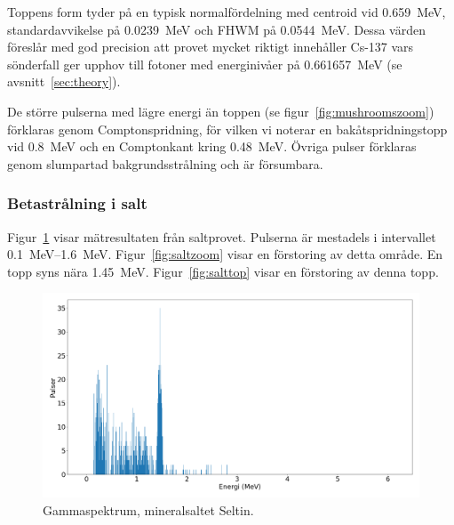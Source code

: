 Toppens form tyder på en typisk normalfördelning med centroid vid
\qty{0.659}{\MeV}, standardavvikelse på \qty{0.0239}{\MeV} och FHWM på
\qty{0.0544}{\MeV}. Dessa värden föreslår med god precision att provet mycket
riktigt innehåller Cs-137 vars sönderfall ger upphov till fotoner med
energinivåer på \qty{0.661657}{\MeV} (se avsnitt~\ref{sec:theory}).

De större pulserna med lägre energi än toppen (se
figur~\ref{fig:mushroomszoom}) förklaras genom Comptonspridning, för vilken
vi noterar en bakåtspridningstopp vid \qty{0.8}{\MeV} och en Comptonkant kring
\qty{0.48}{\MeV}. Övriga pulser förklaras genom slumpartad bakgrundsstrålning
och är försumbara.

\subsubsection{Betastrålning i salt}

Figur~\ref{fig:salt} visar mätresultaten från saltprovet. Pulserna är
mestadels i intervallet \qtyrange{0.1}{1.6}{\MeV}. Figur~\ref{fig:saltzoom}
visar en förstoring av detta område. En topp syns nära \qty{1.45}{\MeV}.
Figur~\ref{fig:salttop} visar en förstoring av denna topp.

\begin{figure}[htp]
    \centering
    \includegraphics[width=\textwidth, keepaspectratio]{../images/salt.png}
    \caption{Gammaspektrum, mineralsaltet Seltin.}
    \label{fig:salt}
\end{figure}

